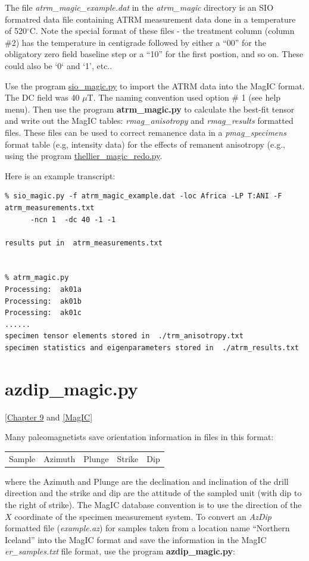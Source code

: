 \documentclass[11pt]{book}
\begin{document}
{{{{{The file {\it atrm\_magic\_example.dat} in the {\it atrm\_magic} directory is an SIO formatred data file containing ATRM measurement data done in a temperature of 520$^{\circ}$C.   Note the special format of these files - the treatment column (column \#2) has the temperature in centigrade followed by either a ``00'' for the obligatory zero field baseline step or a ``10'' for the first postion, and so on.  These could also be `0` and `1', etc..    
 
Use the program \href{#sio_magic.py}{sio\_magic.py} to import the ATRM data  into the MagIC format.  The DC field was 40 $\mu$T.  The naming convention used option \# 1 (see help menu). 
Then use the program {\bf atrm\_magic.py} to calculate the best-fit tensor and write out the MagIC tables: {\it rmag\_anisotropy} and {\it rmag\_results} formatted files.   These files can be used to correct remanence data in a {\it pmag\_specimens} format table (e.g, intensity data) for the effects of remanent anisotropy (e.g., using the program \href{#thellier_magic.py}{thellier\_magic\_redo.py}.

Here is an example transcript:

\begin{verbatim}
% sio_magic.py -f atrm_magic_example.dat -loc Africa -LP T:ANI -F atrm_measurements.txt 
      -ncn 1  -dc 40 -1 -1

results put in  atrm_measurements.txt


% atrm_magic.py 
Processing:  ak01a
Processing:  ak01b
Processing:  ak01c
......
specimen tensor elements stored in  ./trm_anisotropy.txt
specimen statistics and eigenparameters stored in  ./atrm_results.txt
\end{verbatim}

\section {azdip\_magic.py}
 [\href{http://Webbookcopy.html#Getting_Direction}{Chapter 9} and \href{#MagIC}{[MagIC]}%

Many paleomagnetists save orientation information in files in this format:

\begin{tabular}{lllll}
Sample & Azimuth & Plunge & Strike & Dip\\
\end{tabular}
\noindent where the Azimuth and Plunge are the declination and inclination of the drill direction and the strike and dip are the attitude of the sampled unit (with dip to the right of strike).   The MagIC database convention is to 
use the direction of the $X$ coordinate of the specimen measurement system.  To convert an  {\it AzDip} formatted file ({\it example.az}) for samples taken from a location name ``Northern Iceland''  into the MagIC format and save the information in the MagIC {\it er\_samples.txt}  file format, use the program {\bf azdip\_magic.py}:

}}}}}
\end{document}
